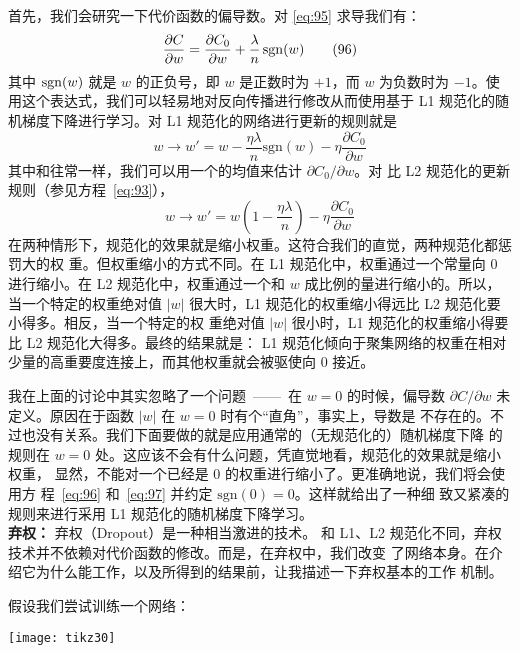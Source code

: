 首先，我们会研究一下代价函数的偏导数。对 \eqref{eq:95} 求导我们有：
\begin{equation}
  \frac{\partial C}{\partial w} = \frac{\partial C_0}{\partial w}
  + \frac{\lambda}{n} \, {\rm sgn}(w)
  \label{eq:96}\tag{96}
\end{equation}
其中 ${\rm sgn}(w)$ 就是 $w$ 的正负号，即 $w$ 是正数时为 $+1$，而 $w$ 为负数时为
$-1$。使用这个表达式，我们可以轻易地对反向传播进行修改从而使用基于 L1 规范化的随
机梯度下降进行学习。对 L1 规范化的网络进行更新的规则就是
\begin{equation}
  w \rightarrow w' = w-\frac{\eta \lambda}{n} \mbox{sgn}(w) - \eta \frac{\partial
  C_0}{\partial w}
  \label{eq:97}\tag{97}
\end{equation}
其中和往常一样，我们可以用一个\minibatch{}的均值来估计 $\partial C_0/\partial w$。对
比 L2 规范化的更新规则（参见方程~\eqref{eq:93}），
\begin{equation}
  w \rightarrow w' = w\left(1 - \frac{\eta \lambda}{n} \right)
  - \eta \frac{\partial C_0}{\partial w}
  \label{eq:98}\tag{98}
\end{equation}
在两种情形下，规范化的效果就是缩小权重。这符合我们的直觉，两种规范化都惩罚大的权
重。但权重缩小的方式不同。在 L1 规范化中，权重通过一个常量向 $0$ 进行缩小。在 L2
规范化中，权重通过一个和 $w$ 成比例的量进行缩小的。所以，当一个特定的权重绝对值
$|w|$ 很大时，L1 规范化的权重缩小得远比 L2 规范化要小得多。相反，当一个特定的权
重绝对值 $|w|$ 很小时，L1 规范化的权重缩小得要比 L2 规范化大得多。最终的结果就是：
L1 规范化倾向于聚集网络的权重在相对少量的高重要度连接上，而其他权重就会被驱使向
$0$ 接近。

我在上面的讨论中其实忽略了一个问题~——~在 $w=0$ 的时候，偏导数 $\partial
C/\partial w$ 未定义。原因在于函数 $|w|$ 在 $w=0$ 时有个“直角”，事实上，导数是
不存在的。不过也没有关系。我们下面要做的就是应用通常的（无规范化的）随机梯度下降
的规则在 $w=0$ 处。这应该不会有什么问题，凭直觉地看，规范化的效果就是缩小权重，
显然，不能对一个已经是 $0$ 的权重进行缩小了。更准确地说，我们将会使用方
程~\eqref{eq:96} 和~\eqref{eq:97} 并约定 $\mbox{sgn}(0) = 0$。这样就给出了一种细
致又紧凑的规则来进行采用 L1 规范化的随机梯度下降学习。\\

\textbf{弃权：} 弃权（Dropout）是一种相当激进的技术。
和 L1、L2 规范化不同，弃权技术并不依赖对代价函数的修改。而是，在弃权中，我们改变
了网络本身。在介绍它为什么能工作，以及所得到的结果前，让我描述一下弃权基本的工作
机制。

假设我们尝试训练一个网络：
\begin{center}
  \texttt{[image: tikz30]}
\end{center}


